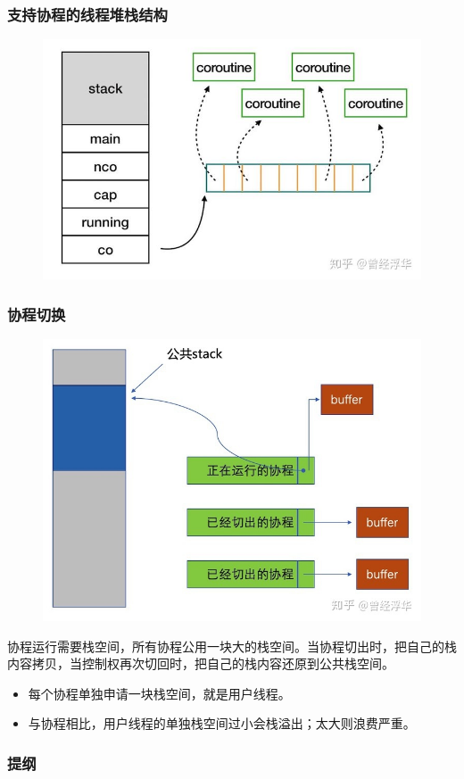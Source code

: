 \begin{frame}[fragile]
    \frametitle{支持协程的线程堆栈结构}
% 
	\begin{figure}
		\centering
		\includegraphics[width=0.75\linewidth]{figs/coroutine-memlayout.jpg}
  \end{figure}



% 

\end{frame}
\begin{frame}[fragile]
    \frametitle{协程切换}
% 
	\begin{figure}
		\centering
		\includegraphics[width=0.4\linewidth]{figs/coroutine-stack.jpg}
  \end{figure}



% 
协程运行需要栈空间，所有协程公用一块大的栈空间。当协程切出时，把自己的栈内容拷贝，当控制权再次切回时，把自己的栈内容还原到公共栈空间。

    \begin{itemize}
        \item 每个协程单独申请一块栈空间，就是用户线程。
        \item 与协程相比，用户线程的单独栈空间过小会栈溢出；太大则浪费严重。 
    \end{itemize}
\end{frame}
% 
\begin{frame}
\frametitle{提纲} %
\tableofcontents %
\end{frame}
